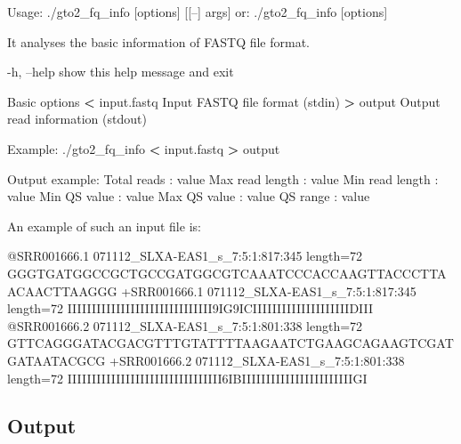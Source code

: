 \documentclass[11pt,]{krantz}
\newenvironment{Shaded}{\begin{snugshade}}{\end{snugshade}}
\newcommand{\OperatorTok}[1]{\textcolor[rgb]{0.43,0.43,0.43}{\textbf{#1}}}
\newcommand{\ExtensionTok}[1]{#1}
\newcommand{\NormalTok}[1]{#1}
\begin{document}
\begin{Shaded}
\begin{Highlighting}[]
\ExtensionTok{Usage}\NormalTok{: ./gto2_fq_info [options] [[--] args]}
   \ExtensionTok{or}\NormalTok{: ./gto2_fq_info [options]}

\ExtensionTok{It}\NormalTok{ analyses the basic information of FASTQ file format.}

    \ExtensionTok{-h}\NormalTok{, --help            show this help message and exit}

\ExtensionTok{Basic}\NormalTok{ options}
    \OperatorTok{<} \ExtensionTok{input.fastq}\NormalTok{         Input FASTQ file format (stdin)}
    \OperatorTok{>} \ExtensionTok{output}\NormalTok{              Output read information (stdout)}

\ExtensionTok{Example}\NormalTok{: ./gto2_fq_info }\OperatorTok{<}\NormalTok{ input.fastq }\OperatorTok{>}\NormalTok{ output}

\ExtensionTok{Output}\NormalTok{ example:}
\ExtensionTok{Total}\NormalTok{ reads     : value}
\ExtensionTok{Max}\NormalTok{ read length : value}
\ExtensionTok{Min}\NormalTok{ read length : value}
\ExtensionTok{Min}\NormalTok{ QS value    : value}
\ExtensionTok{Max}\NormalTok{ QS value    : value}
\ExtensionTok{QS}\NormalTok{ range        : value}
\end{Highlighting}
\end{Shaded}

An example of such an input file is:

\begin{Shaded}
\begin{Highlighting}[]
\ExtensionTok{@SRR001666.1}\NormalTok{ 071112_SLXA-EAS1_s_7:5:1:817:345 length=72}
\ExtensionTok{GGGTGATGGCCGCTGCCGATGGCGTCAAATCCCACCAAGTTACCCTTAACAACTTAAGGG}
\ExtensionTok{+SRR001666.1}\NormalTok{ 071112_SLXA-EAS1_s_7:5:1:817:345 length=72}
\ExtensionTok{IIIIIIIIIIIIIIIIIIIIIIIIIIIIII9IG9ICIIIIIIIIIIIIIIIIIIIIDIII}
\ExtensionTok{@SRR001666.2}\NormalTok{ 071112_SLXA-EAS1_s_7:5:1:801:338 length=72}
\ExtensionTok{GTTCAGGGATACGACGTTTGTATTTTAAGAATCTGAAGCAGAAGTCGATGATAATACGCG}
\ExtensionTok{+SRR001666.2}\NormalTok{ 071112_SLXA-EAS1_s_7:5:1:801:338 length=72}
\ExtensionTok{IIIIIIIIIIIIIIIIIIIIIIIIIIIIIIII6IBIIIIIIIIIIIIIIIIIIIIIIIGI}
\end{Highlighting}
\end{Shaded}

\subsection*{Output}\label{output-4}
\end{document}

